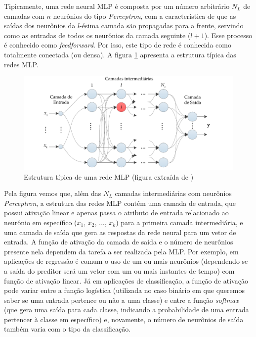 \documentclass[a4paper, 12pt]{article}
\begin{document}
Tipicamente, uma rede neural MLP é composta por um número arbitrário $N_L$ de  camadas com $n$ neurônios do tipo \textit{Perceptron}, com a característica de que as saídas dos neurônios da $l$-ésima camada são propagadas para a frente, servindo como as entradas de todos os neurônios da camada seguinte ($l+1$). Esse processo é conhecido como \textit{feedforward}. Por isso, este tipo de rede é conhecida como totalmente conectada (ou densa). A figura \ref{fig:mlp-architecture} apresenta a estrutura típica das redes MLP.

\begin{figure}[!ht]
\centering
\includegraphics[scale = 0.8]{mlp-network.pdf}
\caption{Estrutura típica de uma rede MLP (figura extraída de \cite{boccato2013novas}) }
\label{fig:mlp-architecture}
\end{figure}

Pela figura vemos que, além das $N_L$ camadas intermediárias com neurônios \textit{Perceptron}, a estrutura das redes MLP contém uma camada de entrada, que possui ativação linear e apenas passa o atributo de entrada relacionado ao neurônio em específico ($x_1$, $x_2$, ..., $x_k$) para a primeira camada intermediária, e uma camada de saída que gera as respostas da rede neural para um vetor de entrada. A função de ativação da camada de saída e o número de neurônios presente nela dependem da tarefa a ser realizada pela MLP. Por exemplo, em aplicações de regressão é comum o uso de um ou mais neurônios (dependendo se a saída do preditor será um vetor com um ou mais instantes de tempo) com função de ativação linear. Já em aplicações de classificação, a função de ativação pode variar entre a função logística (utilizada no caso binário em que queremos saber se uma entrada pertence ou não a uma classe) e entre a função \textit{softmax} (que gera uma saída para cada classe, indicando a probabilidade de uma entrada pertencer à classe em específico) e, novamente, o número de neurônios de saída também varia com o tipo da classificação.
\end{document}
